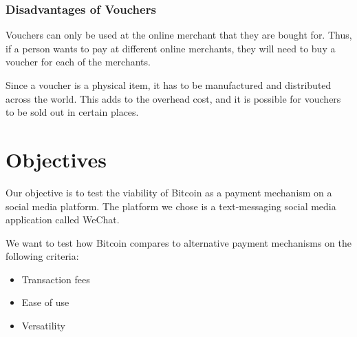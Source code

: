 \subsubsection{Disadvantages of Vouchers}

Vouchers can only be used at the online merchant that they are bought for. Thus, if a person wants to pay at different online merchants, they will need to buy a voucher for each of the merchants. 

Since a voucher is a physical item, it has to be manufactured and distributed across the world. This adds to the overhead cost, and it is possible for vouchers to be sold out in certain places.

\section{Objectives}

Our objective is to test the viability of Bitcoin as a payment mechanism on a social media platform. The platform we chose is a text-messaging social media application called WeChat.

We want to test how Bitcoin compares to alternative payment mechanisms on the following criteria:

\begin{itemize}
	\item{Transaction fees}
	\item{Ease of use}
	\item{Versatility}
\end{itemize}


